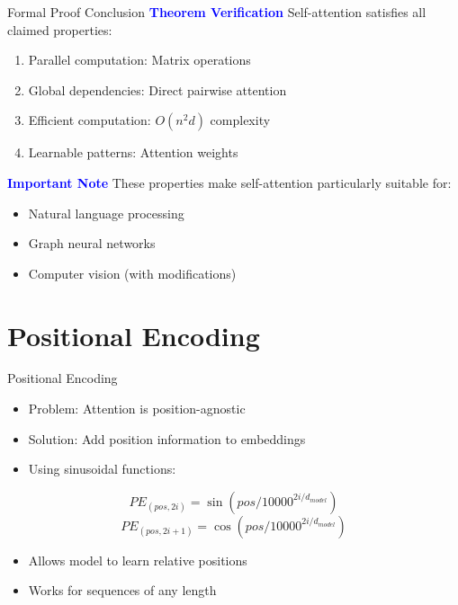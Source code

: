 \documentclass[serif, aspectratio=169]{beamer}
\begin{document}
\begin{frame}{Formal Proof Conclusion}
    \textcolor{blue}{\textbf{Theorem Verification}}
    \newline
        Self-attention satisfies all claimed properties:
        \begin{enumerate}
            \item Parallel computation: Matrix operations
            \item Global dependencies: Direct pairwise attention
            \item Efficient computation: $O(n^2d)$ complexity
            \item Learnable patterns: Attention weights
        \end{enumerate}
    \textcolor{blue}{\textbf{Important Note}}
    \newline
        These properties make self-attention particularly suitable for:
        \begin{itemize}
            \item Natural language processing
            \item Graph neural networks
            \item Computer vision (with modifications)
        \end{itemize}
\end{frame}

\section{Positional Encoding}
\begin{frame}{Positional Encoding}
    \begin{itemize}
        \item Problem: Attention is position-agnostic
        \item Solution: Add position information to embeddings
        \item Using sinusoidal functions:
    \end{itemize}
    \begin{equation*}
        PE_{(pos,2i)} = \sin(pos/10000^{2i/d_{model}})
    \end{equation*}
    \begin{equation*}
        PE_{(pos,2i+1)} = \cos(pos/10000^{2i/d_{model}})
    \end{equation*}

    \begin{itemize}
        \item Allows model to learn relative positions
        \item Works for sequences of any length
    \end{itemize}
    
\end{frame}
\end{document}
